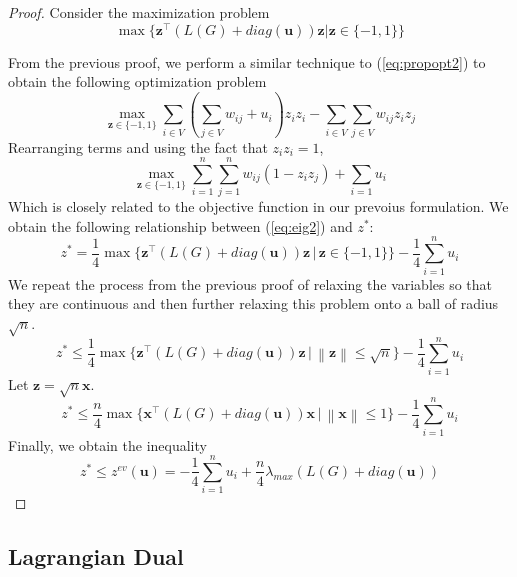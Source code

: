 \documentclass[12pt]{article}
\theoremstyle{plain}
\theoremstyle{definition}
\newcommand{\norm}[1]{\left\lVert#1\right\rVert}
\begin{document}
\begin{proof}
    Consider the maximization problem
    \begin{equation}\label{eq:propopt2}
        \max\lbrace \mathbf{z}^\top (L(G) + diag(\mathbf{u})) \mathbf{z} | \mathbf{z} \in \lbrace -1,1\rbrace \rbrace
    \end{equation}
   
    From the previous proof, we perform a similar technique to (\ref{eq:propopt2}) to obtain the following optimization problem 
    \[
    \max_{\mathbf{z} \in \lbrace -1,1 \rbrace} \sum_{i \in V}\left(\sum_{j \in V} w_{ij} + u_i \right) z_i z_i - \sum_{i \in V}\sum_{j \in V} w_{ij}z_i z_j
    \] 
    Rearranging terms and using the fact that $z_i z_i = 1$,
    \begin{equation}
        \max_{\mathbf{z} \in \lbrace -1, 1\rbrace} \sum_{i = 1}^n \sum_{j=1}^n w_{ij} (1 - z_i z_j) + \sum_{i = 1} u_i \label{eq:eig2}
    \end{equation}
    Which is closely related to the objective function in our prevoius formulation. We obtain the following relationship between (\ref{eq:eig2}) and $z^*$:
    \[
      z^* = \frac{1}{4} \max\lbrace \mathbf{z}^\top (L(G) + diag(\mathbf{u})) \mathbf{z} \,|\, \mathbf{z} \in \lbrace -1,1\rbrace \rbrace - \frac{1}{4}\sum_{i=1}^n u_i   
    \]
    We repeat the process from the previous proof of relaxing the variables so that they are continuous and then further relaxing this problem onto a ball of radius $\sqrt{n}$.
    \[
        z^* \leq \frac{1}{4} \max\lbrace \mathbf{z}^\top (L(G) + diag(\mathbf{u})) \mathbf{z} \,|\, \norm{\mathbf{z}} \leq \sqrt{n} \rbrace - \frac{1}{4}\sum_{i=1}^n u_i
    \]
    Let $\mathbf{z} = \sqrt{n} \mathbf{x}$. 
    \[
        z^* \leq \frac{n}{4} \max\lbrace \mathbf{x}^\top (L(G) + diag(\mathbf{u})) \mathbf{x} \,|\, \norm{\mathbf{x}} \leq 1\rbrace - \frac{1}{4}\sum_{i=1}^n u_i
    \]
    Finally, we obtain the inequality
    \begin{equation}
        z^* \leq z^{ev}(\mathbf{u}) = -\frac{1}{4}\sum_{i=1}^n u_i + \dfrac{n}{4} \lambda_{max}(L(G) + diag(\mathbf{u}))
    \end{equation}
\end{proof}
    
\subsection{Lagrangian Dual}\label{subsec:LDbound}
\end{document}
